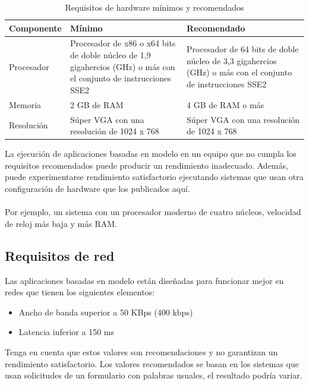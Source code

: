 \documentclass[12pt, a4paper, titlepage]{article}
\begin{document}
			\begin{table}[!htbp]
				\caption[Requisitos hardware]{Requisitos de hardware mínimos y recomendados}
				\begin{tabular}{| p{4cm} | p{4cm} | p{4cm} |} 
					\hline
					\textbf{Componente} & \textbf{Mínimo} & \textbf{Recomendado} \\ 
					\hline
					Procesador & Procesador de x86 o x64 bits de doble núcleo de 1,9 gigahercios (GHz) o más con el conjunto de instrucciones SSE2 & Procesador de 64 bits de doble núcleo de 3,3 gigahercios (GHz) o más con el conjunto de instrucciones SSE2 \\ 
					\hline
					Memoria & 2 GB de RAM & 4 GB de RAM o más \\
					\hline
					Resolución  & Súper VGA con una resolución de 1024 x 768 & Súper VGA con una resolución de 1024 x 768 \\
					\hline
				\end{tabular}
			\end{table}
		
			
			La ejecución de aplicaciones basadas en modelo en un equipo
			que no cumpla los requisitos recomendados puede producir un
			rendimiento inadecuado. Además, puede experimentarse
			rendimiento satisfactorio ejecutando sistemas que usan otra
			configuración de hardware que los publicados aquí.\\\\
			Por ejemplo, un sistema con un procesador moderno
			de cuatro núcleos, velocidad de reloj más baja y más RAM.
		
		\subsection{Requisitos de red}
		Las aplicaciones basadas en modelo están diseñadas para funcionar
		mejor en redes que tienen los siguientes elementos:
		
		\begin{itemize}
			\item Ancho de banda superior a 50 KBps (400 kbps)
			\item Latencia inferior a 150 ms
		\end{itemize}
		
		Tenga en cuenta que estos valores son recomendaciones y no garantizan
		un rendimiento satisfactorio. Los valores recomendados se basan en los
		sistemas que usan solicitudes de un formulario con palabras usuales,
		el resultado podría variar.
		
\end{document}
